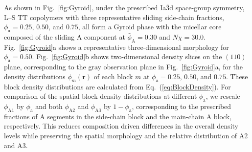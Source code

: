As shown in Fig.~\ref{fig:Gyroid}, under the prescribed Ia$\overline{3}$d space-group symmetry, L--S TT copolymers with three representative sliding side-chain fractions, $\phi_{\mathrm a}=0.25$, $0.50$, and $0.75$, all form a Gyroid phase with the micellar core composed of the sliding A component at $\bar{\phi}_{\mathrm A}=0.30$ and $N\chi=30.0$.
Fig.~\ref{fig:Gyroid}a shows a representative three-dimensional morphology for $\phi_{\mathrm a}=0.50$.
Fig.~\ref{fig:Gyroid}b shows two-dimensional density slices on the $(110)$ plane, corresponding to the gray observation plane in Fig.~\ref{fig:Gyroid}a, for the density distributions $\phi_m(\bm r)$ of each block $m$ at $\phi_{\mathrm a}=0.25$, $0.50$, and $0.75$.
These block density distributions are calculated from Eq.~(\ref{eq:BlockDensity}).
For comparison of the spatial block-density distributions at different $\phi_{\mathrm a}$, we rescale $\phi_{\mathrm{A1}}$ by $\phi_{\mathrm a}$ and both $\phi_{\mathrm{A2}}$ and $\phi_{\mathrm{A3}}$ by $1-\phi_{\mathrm a}$, corresponding to the prescribed fractions of A segments in the side-chain block and the main-chain A block, respectively.
This reduces composition driven differences in the overall density levels while preserving the spatial morphology and the relative distribution of A2 and A3.

